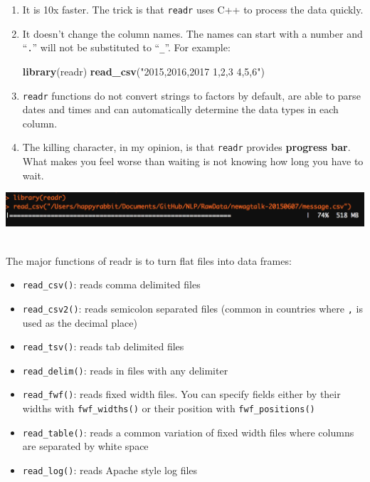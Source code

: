 \documentclass[12pt,]{krantz}
\makeatletter
\newenvironment{Shaded}{\begin{snugshade}}{\end{snugshade}}
\newcommand{\KeywordTok}[1]{\textcolor[rgb]{0.27,0.27,0.27}{\textbf{#1}}}
\newcommand{\StringTok}[1]{\textcolor[rgb]{0.5,0.5,0.5}{#1}}
\newcommand{\NormalTok}[1]{#1}
\providecommand{\tightlist}{%
  \setlength{\itemsep}{0pt}\setlength{\parskip}{0pt}}
\newenvironment{kframe}{%
\medskip{}
\setlength{\fboxsep}{.8em}
 \def\at@end@of@kframe{}%
 \ifinner\ifhmode%
  \def\at@end@of@kframe{\end{minipage}}%
  \begin{minipage}{\columnwidth}%
 \fi\fi%
 \def\FrameCommand##1{\hskip\@totalleftmargin \hskip-\fboxsep
 \colorbox{shadecolor}{##1}\hskip-\fboxsep
     \hskip-\linewidth \hskip-\@totalleftmargin \hskip\columnwidth}%
 \MakeFramed {\advance\hsize-\width
   \@totalleftmargin\z@ \linewidth\hsize
   \@setminipage}}%
 {\par\unskip\endMakeFramed%
 \at@end@of@kframe}
\renewenvironment{Shaded}{\begin{kframe}}{\end{kframe}}
\theoremstyle{definition}
\theoremstyle{definition}
\theoremstyle{definition}
\theoremstyle{remark}
\makeatother
\begin{document}
\begin{enumerate}
\def\labelenumi{\arabic{enumi}.}
\item
  It is 10x faster. The trick is that \texttt{readr} uses C++ to process
  the data quickly.
\item
  It doesn't change the column names. The names can start with a number
  and ``\texttt{.}'' will not be substituted to ``\texttt{\_}''. For
  example:

\begin{Shaded}
\begin{Highlighting}[]
\KeywordTok{library}\NormalTok{(readr)}
\KeywordTok{read_csv}\NormalTok{(}\StringTok{"2015,2016,2017}
\StringTok{1,2,3}
\StringTok{4,5,6"}\NormalTok{)}
\end{Highlighting}
\end{Shaded}
\item
  \texttt{readr} functions do not convert strings to factors by default,
  are able to parse dates and times and can automatically determine the
  data types in each column.
\item
  The killing character, in my opinion, is that \texttt{readr} provides
  \textbf{progress bar}. What makes you feel worse than waiting is not
  knowing how long you have to wait.
\end{enumerate}

\includegraphics{images/prograssbar.png}~

The major functions of readr is to turn flat files into data frames:

\begin{itemize}
\tightlist
\item
  \texttt{read\_csv()}: reads comma delimited files
\item
  \texttt{read\_csv2()}: reads semicolon separated files (common in
  countries where \texttt{,} is used as the decimal place)
\item
  \texttt{read\_tsv()}: reads tab delimited files
\item
  \texttt{read\_delim()}: reads in files with any delimiter
\item
  \texttt{read\_fwf()}: reads fixed width files. You can specify fields
  either by their widths with \texttt{fwf\_widths()} or their position
  with \texttt{fwf\_positions()}\\
\item
  \texttt{read\_table()}: reads a common variation of fixed width files
  where columns are separated by white space
\item
  \texttt{read\_log()}: reads Apache style log files
\end{itemize}
\end{document}
